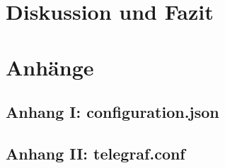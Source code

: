 \documentclass[a4paper, 12pt, oneside, toc=listofnumbered, bibliography=totoc]{scrbook}
\begin{document}
	\chapter{Diskussion und Fazit}\label{ch:Diskussion_Fazit}
	
	
	
	\printbibliography
	\frontmatter
	
	\pagebreak
	\chapter{Anhänge} %
	\section*{Anhang I: configuration.json}
	
	\pagebreak
	\section*{Anhang II: telegraf.conf}
	
	\pagebreak
\end{document}

